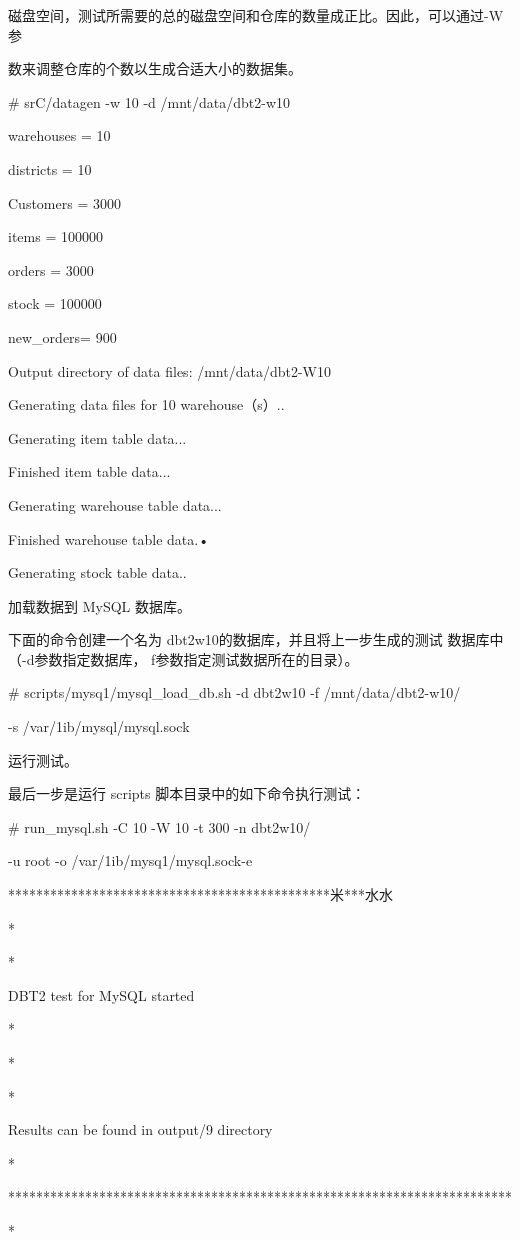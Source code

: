 磁盘空间，测试所需要的总的磁盘空间和仓库的数量成正比。因此，可以通过-W 参

数来调整仓库的个数以生成合适大小的数据集。

# srC/datagen -w 10 -d /mnt/data/dbt2-w10

warehouses = 10

districts = 10

Customers = 3000

items = 100000

orders = 3000

stock = 100000

new\_orders= 900

Output directory of data files: /mnt/data/dbt2-W10

Generating data files for 10 warehouse（s）..

Generating item table data...

Finished item table data...

Generating warehouse table data...

Finished warehouse table data.•

Generating stock table data..

加载数据到 MySQL 数据库。

下面的命令创建一个名为 dbt2w10的数据库，并且将上一步生成的测试
数据库中（-d参数指定数据库， f参数指定测试数据所在的目录）。

# scripts/mysq1/mysql\_load\_db.sh -d dbt2w10 -f /mnt/data/dbt2-w10/

-s /var/1ib/mysql/mysql.sock

运行测试。

最后一步是运行 scripts 脚本目录中的如下命令执行测试：

# run\_mysql.sh -C 10 -W 10 -t 300 -n dbt2w10/

-u root -o /var/1ib/mysq1/mysql.sock-e

**********************************************米***水水

*

*

DBT2 test for MySQL started

*

*

*

Results can be found in output/9 directory

*

************************************************************************

*

